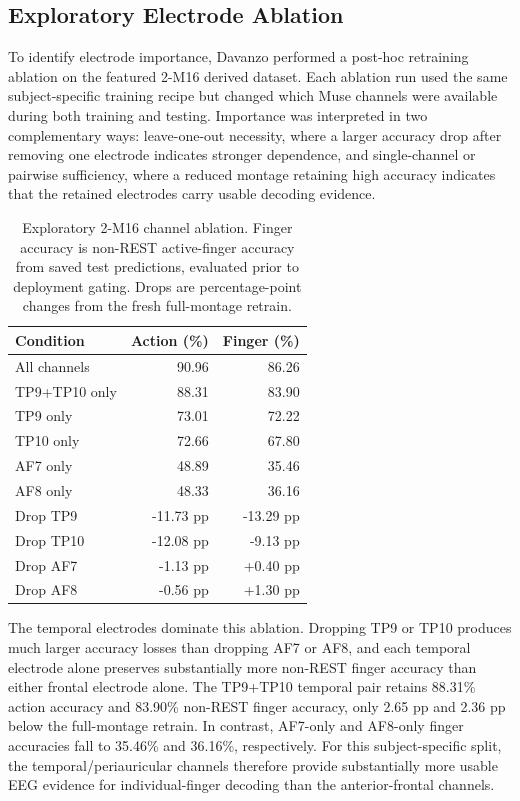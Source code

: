 \documentclass[conference]{IEEEtran}
\begin{document}
\subsection{Exploratory Electrode Ablation}
To identify electrode importance, Davanzo performed a post-hoc retraining ablation on the featured 2-M16 derived dataset. Each ablation run used the same subject-specific training recipe but changed which Muse channels were available during both training and testing. Importance was interpreted in two complementary ways: leave-one-out necessity, where a larger accuracy drop after removing one electrode indicates stronger dependence, and single-channel or pairwise sufficiency, where a reduced montage retaining high accuracy indicates that the retained electrodes carry usable decoding evidence.

\begin{table}[t]
\caption{Exploratory 2-M16 channel ablation. Finger accuracy is non-REST active-finger accuracy from saved test predictions, evaluated prior to deployment gating. Drops are percentage-point changes from the fresh full-montage retrain.}
\label{tab:channel-ablation}
\centering
\footnotesize
\begin{tabular}{lrr}
\toprule
Condition & Action (\%) & Finger (\%) \\
\midrule
All channels & 90.96 & 86.26 \\
TP9+TP10 only & 88.31 & 83.90 \\
TP9 only & 73.01 & 72.22 \\
TP10 only & 72.66 & 67.80 \\
AF7 only & 48.89 & 35.46 \\
AF8 only & 48.33 & 36.16 \\
\midrule
Drop TP9 & -11.73 pp & -13.29 pp \\
Drop TP10 & -12.08 pp & -9.13 pp \\
Drop AF7 & -1.13 pp & +0.40 pp \\
Drop AF8 & -0.56 pp & +1.30 pp \\
\bottomrule
\end{tabular}
\end{table}

The temporal electrodes dominate this ablation. Dropping TP9 or TP10 produces much larger accuracy losses than dropping AF7 or AF8, and each temporal electrode alone preserves substantially more non-REST finger accuracy than either frontal electrode alone. The TP9+TP10 temporal pair retains 88.31\% action accuracy and 83.90\% non-REST finger accuracy, only 2.65 pp and 2.36 pp below the full-montage retrain. In contrast, AF7-only and AF8-only finger accuracies fall to 35.46\% and 36.16\%, respectively. For this subject-specific split, the temporal/periauricular channels therefore provide substantially more usable EEG evidence for individual-finger decoding than the anterior-frontal channels.
\end{document}
